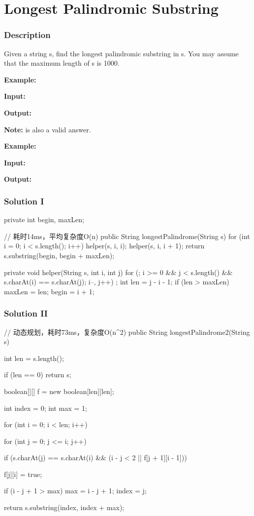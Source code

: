 \newpage

\section{Longest Palindromic Substring} %

\subsubsection{Description}
Given a string s, find the longest palindromic substring in s. You may assume that the maximum length of s is 1000.

\textbf{Example:}

\textbf{Input:} 

\textbf{Output:} 

\textbf{Note:}  is also a valid answer.

\textbf{Example:}

\textbf{Input:} 

\textbf{Output:} 

\subsubsection{Solution I}

\begin{Code}
private int begin, maxLen;

// 耗时14ms，平均复杂度O(n)
public String longestPalindrome(String s) {
    for (int i = 0; i < s.length(); i++) {
        helper(s, i, i);
        helper(s, i, i + 1);
    }
    return s.substring(begin, begin + maxLen);
}

private void helper(String s, int i, int j) {
    for (; i >= 0 && j < s.length() && s.charAt(i) == s.charAt(j); i--, j++) ;
    int len = j - i - 1;
    if (len > maxLen) {
        maxLen = len;
        begin = i + 1;
    }
}
\end{Code}

\newpage

\subsubsection{Solution II}
\begin{Code}
// 动态规划，耗时73ms，复杂度O(n^2)
public String longestPalindrome2(String s) {
    int len = s.length();

    if (len == 0) {
        return s;
    }

    boolean[][] f = new boolean[len][len];

    int index = 0;
    int max = 1;

    for (int i = 0; i < len; i++) {
        for (int j = 0; j <= i; j++) {
            if (s.charAt(j) == s.charAt(i) && (i - j < 2 || f[j + 1][i - 1])) {
                f[j][i] = true;

                if (i - j + 1 > max) {
                    max = i - j + 1;
                    index = j;
                }
            }
        }
    }

    return s.substring(index, index + max);
}
\end{Code}

